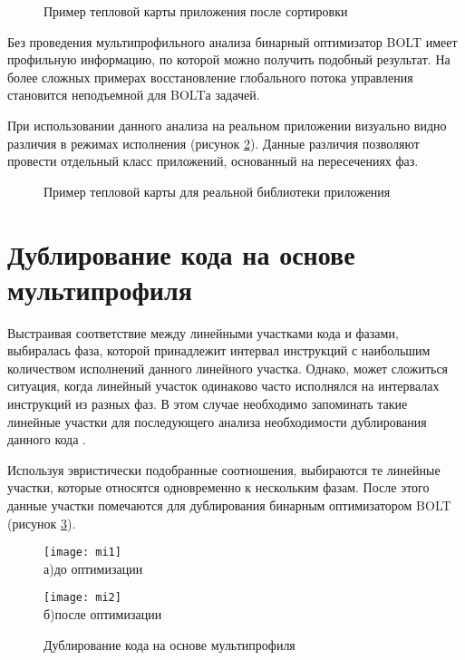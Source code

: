 \begin{figure}[!h]
    \centerfloat{
        \texttt{[image: \_15б]}
    }
    \caption{Пример тепловой карты приложения после сортировки}\label{fig:MP3}
\end{figure}

Без проведения мультипрофильного анализа бинарный оптимизатор BOLT имеет профильную информацию, по которой можно получить подобный результат. На более сложных примерах восстановление глобального потока управления становится неподъемной для BOLTа задачей.

При использовании данного анализа на реальном приложении визуально видно различия в режимах исполнения (рисунок \cref{fig:MP4}). Данные различия позволяют провести отдельный класс приложений, основанный на пересечениях фаз.

\begin{figure}[!h]
    \caption{Пример тепловой карты для реальной библиотеки приложения}\label{fig:MP4}
\end{figure}

\section{Дублирование кода на основе мультипрофиля}\label{sec:ch4/sect3}
Выстраивая соответствие между линейными участками кода и фазами, выбиралась фаза, которой принадлежит интервал инструкций с наибольшим количеством исполнений данного линейного участка. Однако, может сложиться ситуация, когда линейный участок одинаково часто исполнялся на интервалах инструкций из разных фаз. В этом случае необходимо запоминать такие линейные участки для последующего анализа необходимости дублирования данного кода \cite{Desmond2009}.

Используя эвристически подобранные соотношения, выбираются те линейные участки, которые относятся одновременно к нескольким фазам. После этого данные участки помечаются для дублирования бинарным оптимизатором BOLT (рисунок \cref{fig:MPOpt}).

\begin{figure}[!h]
    \begin{minipage}[b][][b]{0.49\linewidth}\centering
        \texttt{[image: mi1]} \\ а)до оптимизации
    \end{minipage}
    \hfill
    \begin{minipage}[b][][b]{0.49\linewidth}\centering
        \texttt{[image: mi2]} \\ б)после оптимизации
    \end{minipage}
    \caption{Дублирование кода на основе мультипрофиля}
    \label{fig:MPOpt}
\end{figure}

